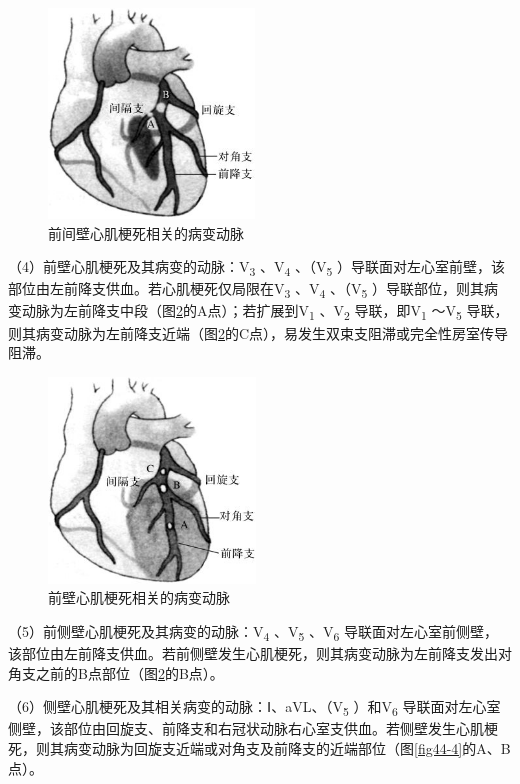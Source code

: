 \begin{figure}[!htbp]
 \centering
 \includegraphics[width=2.15625in,height=2.19792in]{./images/Image00710.jpg}
 \captionsetup{justification=centering}
 \caption{前间壁心肌梗死相关的病变动脉}
 \label{fig44-2}
  \end{figure} 

（4）前壁心肌梗死及其病变的动脉：V\textsubscript{3} 、V\textsubscript{4}
、（V\textsubscript{5}
）导联面对左心室前壁，该部位由左前降支供血。若心肌梗死仅局限在V\textsubscript{3}
、V\textsubscript{4} 、（V\textsubscript{5}
）导联部位，则其病变动脉为左前降支中段（图\ref{fig44-3}的A点）；若扩展到V\textsubscript{1}
、V\textsubscript{2} 导联，即V\textsubscript{1} ～V\textsubscript{5}
导联，则其病变动脉为左前降支近端（图\ref{fig44-3}的C点），易发生双束支阻滞或完全性房室传导阻滞。

\begin{figure}[!htbp]
 \centering
 \includegraphics[width=2.16667in,height=2.15625in]{./images/Image00711.jpg}
 \captionsetup{justification=centering}
 \caption{前壁心肌梗死相关的病变动脉}
 \label{fig44-3}
  \end{figure} 

（5）前侧壁心肌梗死及其病变的动脉：V\textsubscript{4}
、V\textsubscript{5} 、V\textsubscript{6}
导联面对左心室前侧壁，该部位由左前降支供血。若前侧壁发生心肌梗死，则其病变动脉为左前降支发出对角支之前的B点部位（图\ref{fig44-3}的B点）。

（6）侧壁心肌梗死及其相关病变的动脉：Ⅰ、aVL、（V\textsubscript{5}
）和V\textsubscript{6}
导联面对左心室侧壁，该部位由回旋支、前降支和右冠状动脉右心室支供血。若侧壁发生心肌梗死，则其病变动脉为回旋支近端或对角支及前降支的近端部位（图\ref{fig44-4}的A、B点）。

